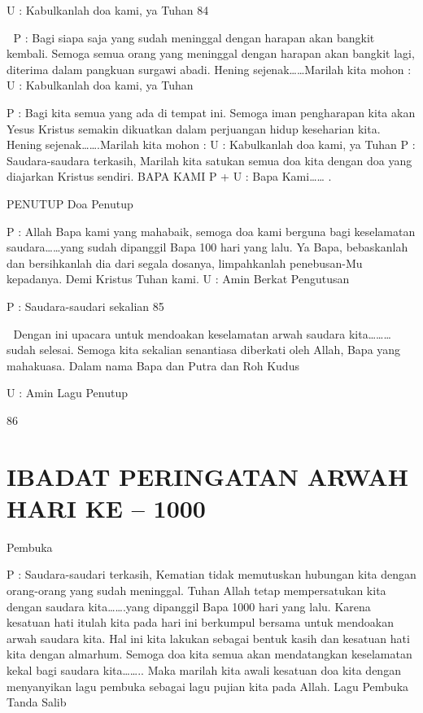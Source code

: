 \documentclass[10pt,a5paper,fancyhdr]{memoir}
\begin{document}
U : Kabulkanlah doa kami, ya Tuhan 
84 



P : Bagi siapa saja yang sudah meninggal dengan harapan 
akan bangkit kembali. 
Semoga semua orang yang meninggal dengan harapan 
akan bangkit lagi, diterima dalam pangkuan surgawi 
abadi. 
Hening sejenak……Marilah kita mohon : 
U : Kabulkanlah doa kami, ya Tuhan 

P 
: Bagi kita semua yang ada di tempat ini. 
Semoga iman pengharapan kita akan Yesus Kristus 
semakin dikuatkan dalam perjuangan hidup keseharian 
kita. 
Hening sejenak…….Marilah kita mohon : 
U 
: Kabulkanlah doa kami, ya Tuhan 
P : Saudara-saudara terkasih, 
Marilah kita satukan semua doa kita dengan doa yang diajarkan 
Kristus sendiri. 
BAPA KAMI 
P + U : Bapa Kami……
. 


PENUTUP 
Doa Penutup 


P 
: Allah Bapa kami yang mahabaik, semoga doa kami 
berguna bagi keselamatan saudara……yang sudah 
dipanggil Bapa 100 hari yang lalu. Ya Bapa, bebaskanlah 
dan bersihkanlah dia dari segala dosanya, limpahkanlah 
penebusan-Mu kepadanya. Demi Kristus Tuhan kami. 
U 
: Amin 
Berkat Pengutusan 

P 
: Saudara-saudari sekalian 
85 



Dengan ini upacara untuk mendoakan keselamatan arwah 
saudara kita………sudah selesai. Semoga kita sekalian 
senantiasa diberkati oleh Allah, Bapa yang mahakuasa. 
Dalam nama Bapa dan Putra dan Roh Kudus 

U : Amin 
Lagu Penutup 

86 



\chapter{IBADAT PERINGATAN ARWAH HARI KE – 1000} 

Pembuka 

P 
: Saudara-saudari terkasih, 
Kematian tidak memutuskan hubungan kita dengan 
orang-orang yang sudah meninggal. Tuhan Allah tetap 
mempersatukan kita dengan saudara kita…….yang 
dipanggil Bapa 1000 hari yang lalu. Karena kesatuan hati 
itulah kita pada hari ini berkumpul bersama untuk 
mendoakan arwah saudara kita. Hal ini kita lakukan 
sebagai bentuk kasih dan kesatuan hati kita dengan 
almarhum. Semoga doa kita semua akan mendatangkan 
keselamatan kekal bagi saudara kita…….. Maka marilah 
kita awali kesatuan doa kita dengan menyanyikan lagu 
pembuka sebagai lagu pujian kita pada Allah. 
Lagu Pembuka 
Tanda Salib 
\end{document}
